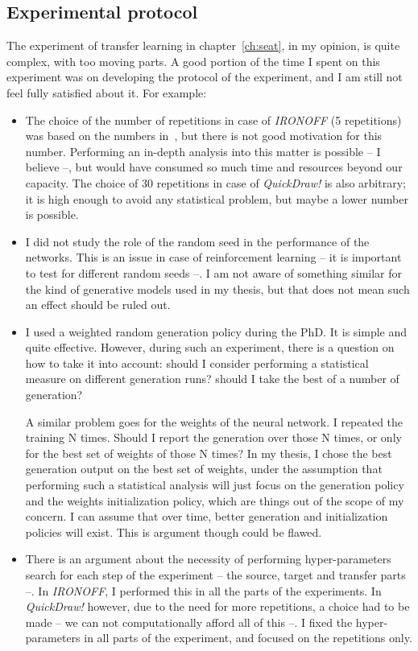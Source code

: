   \subsection{Experimental protocol}
    \par The experiment of transfer learning in chapter~\ref{ch:seat}, in my opinion, is quite complex, with too moving parts. A good portion of the time I spent on this experiment was on developing the protocol of the experiment, and I am still not feel fully satisfied about it. For example:
    \begin{itemize}
      \item The choice of the number of repetitions in case of \textit{IRONOFF} (5 repetitions) was based on the numbers in~\citep{8686063}, but there is not good motivation for this number. Performing an in-depth analysis into this matter is possible -- I believe --, but would have consumed so much time and resources beyond our capacity. The choice of 30 repetitions in case of \textit{QuickDraw!} is also arbitrary; it is high enough to avoid any statistical problem, but maybe a lower number is possible.
      \item I did not study the role of the random seed in the performance of the networks. This is an issue in case of reinforcement learning -- it is important to test for different random seeds --. I am not aware of something similar for the kind of generative models used in my thesis, but that does not mean such an effect should be ruled out.
      \item I used a weighted random generation policy during the PhD. It is simple and quite effective. However, during such an experiment, there is a question on how to take it into account: should I consider performing a statistical measure on different generation runs? should I take the best of a number of generation?

      A similar problem goes for the weights of the neural network. I repeated the training N times. Should I report the generation over those N times, or only for the best set of weights of those N times? In my thesis, I chose the best generation output on the best set of weights, under the assumption that performing such a statistical analysis will just focus on the generation policy and the weights initialization policy, which are things out of the scope of my concern. I can assume that over time, better generation and initialization policies will exist. This is argument though could be flawed.

      \item There is an argument about the necessity of performing hyper-parameters search for each step of the experiment -- the source, target and transfer parts --. In \textit{IRONOFF}, I performed this in all the parts of the experiments. In \textit{QuickDraw!} however, due to the need for more repetitions, a choice had to be made -- we can not computationally afford all of this --. I fixed the hyper-parameters in all parts of the experiment, and focused on the repetitions only.


\end{itemize}
